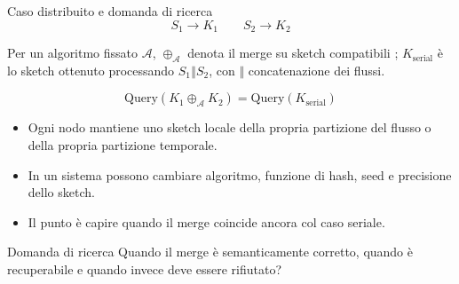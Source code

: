 \documentclass[aspectratio=169,11pt]{beamer}
\begin{document}
\begin{frame}{Caso distribuito e domanda di ricerca}
  \[
    S_1 \longrightarrow K_1
    \qquad
    S_2 \longrightarrow K_2
  \]

  \vspace{0.15cm}

  \small
  Per un algoritmo fissato \(\mathcal{A}\), \(\oplus_{\mathcal{A}}\) denota il merge su sketch compatibili \cite{Agarwal_Cormode_Huang_Phillips_Wei_Yi_2012};
  \(K_{\mathrm{serial}}\) \`e lo sketch ottenuto processando \(S_1 \mathbin{\Vert} S_2\),
  con \(\mathbin{\Vert}\) concatenazione dei flussi.

  \normalsize

  \[
    \mathrm{Query}(K_1 \oplus_{\mathcal{A}} K_2)
    =
    \mathrm{Query}(K_{\mathrm{serial}})
  \]

  \vspace{0.15cm}

  \begin{itemize}
    \item Ogni nodo mantiene uno sketch locale della propria partizione del flusso o della propria partizione temporale.
    \item In un sistema possono cambiare algoritmo, funzione di hash, seed e precisione dello sketch.
    \item Il punto \`e capire quando il merge coincide ancora col caso seriale.
  \end{itemize}

  \begin{alertblock}{Domanda di ricerca}
    Quando il merge \`e semanticamente corretto, quando \`e recuperabile e quando invece deve essere rifiutato?
  \end{alertblock}
\end{frame}
\end{document}
